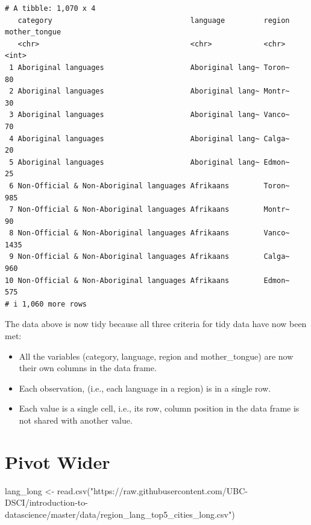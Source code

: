 \documentclass[
  letterpaper,
  DIV=11,
  numbers=noendperiod]{scrartcl}
\newenvironment{Shaded}{\begin{snugshade}}{\end{snugshade}}
\newcommand{\FunctionTok}[1]{\textcolor[rgb]{0.28,0.35,0.67}{#1}}
\newcommand{\NormalTok}[1]{\textcolor[rgb]{0.00,0.23,0.31}{#1}}
\newcommand{\OtherTok}[1]{\textcolor[rgb]{0.00,0.23,0.31}{#1}}
\newcommand{\StringTok}[1]{\textcolor[rgb]{0.13,0.47,0.30}{#1}}
\providecommand{\tightlist}{%
  \setlength{\itemsep}{0pt}\setlength{\parskip}{0pt}}\usepackage{longtable,booktabs,array}
\begin{document}
\begin{verbatim}
# A tibble: 1,070 x 4
   category                                language         region mother_tongue
   <chr>                                   <chr>            <chr>          <int>
 1 Aboriginal languages                    Aboriginal lang~ Toron~            80
 2 Aboriginal languages                    Aboriginal lang~ Montr~            30
 3 Aboriginal languages                    Aboriginal lang~ Vanco~            70
 4 Aboriginal languages                    Aboriginal lang~ Calga~            20
 5 Aboriginal languages                    Aboriginal lang~ Edmon~            25
 6 Non-Official & Non-Aboriginal languages Afrikaans        Toron~           985
 7 Non-Official & Non-Aboriginal languages Afrikaans        Montr~            90
 8 Non-Official & Non-Aboriginal languages Afrikaans        Vanco~          1435
 9 Non-Official & Non-Aboriginal languages Afrikaans        Calga~           960
10 Non-Official & Non-Aboriginal languages Afrikaans        Edmon~           575
# i 1,060 more rows
\end{verbatim}

The data above is now tidy because all three criteria for tidy data have
now been met:

\begin{itemize}
\tightlist
\item
  All the variables (category, language, region and mother\_tongue) are
  now their own columns in the data frame.
\item
  Each observation, (i.e., each language in a region) is in a single
  row.
\item
  Each value is a single cell, i.e., its row, column position in the
  data frame is not shared with another value.
\end{itemize}

\hypertarget{pivot-wider}{%
\section{Pivot Wider}\label{pivot-wider}}

\begin{Shaded}
\begin{Highlighting}[]
\NormalTok{lang\_long }\OtherTok{\textless{}{-}} \FunctionTok{read.csv}\NormalTok{(}\StringTok{"https://raw.githubusercontent.com/UBC{-}DSCI/introduction{-}to{-}datascience/master/data/region\_lang\_top5\_cities\_long.csv"}\NormalTok{)}
\end{Highlighting}
\end{Shaded}
\end{document}
